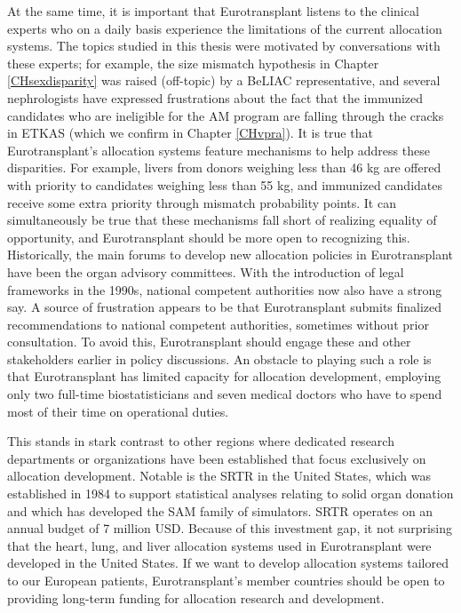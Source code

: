 \documentclass[11pt,twoside,]{book}
\begin{document}
At the same time, it is important that Eurotransplant listens to the clinical
experts who on a daily basis experience the limitations of the current allocation
systems. The topics studied in this thesis were motivated by conversations
with these experts; for example, the size mismatch hypothesis in
Chapter \ref{CHsexdisparity} was raised (off-topic) by a BeLIAC
representative, and several nephrologists have expressed frustrations about the fact
that the immunized candidates who are ineligible for the AM program are falling through the cracks
in ETKAS (which we confirm in Chapter \ref{CHvpra}). It is true that Eurotransplant's
allocation systems feature mechanisms to help address these disparities.
For example, livers from donors weighing less than 46 kg
are offered with priority to candidates weighing less than 55 kg, and immunized candidates receive some extra
priority through mismatch probability points. It can simultaneously be true that these
mechanisms fall short of realizing equality of opportunity, and Eurotransplant
should be more open to recognizing this.
\newpage
Historically, the main forums to develop new allocation policies in Eurotransplant
have been the organ advisory committees. With the introduction of legal frameworks
in the 1990s, national competent authorities now also have a strong say. A source
of frustration appears to be that Eurotransplant submits finalized recommendations
to national competent authorities, sometimes without prior consultation. To avoid
this, Eurotransplant should engage these and other stakeholders earlier in policy discussions.
An obstacle to playing such a role is that Eurotransplant has limited capacity
for allocation development, employing only two full-time biostatisticians and
seven medical doctors who have to spend most of their time on operational duties.

This stands in stark contrast to other regions where dedicated research
departments or organizations have been established that focus exclusively
on allocation development. Notable is the SRTR in the
United States, which was established in 1984 to support statistical analyses
relating to solid organ donation and which has developed the SAM family of
simulators. SRTR operates on an annual budget of 7 million USD. Because of
this investment gap, it not surprising that the heart, lung, and liver allocation systems
used in Eurotransplant were developed in the United States. If we want to
develop allocation systems tailored to our European patients, Eurotransplant's
member countries should be open to providing long-term funding for allocation
research and development.
\end{document}
